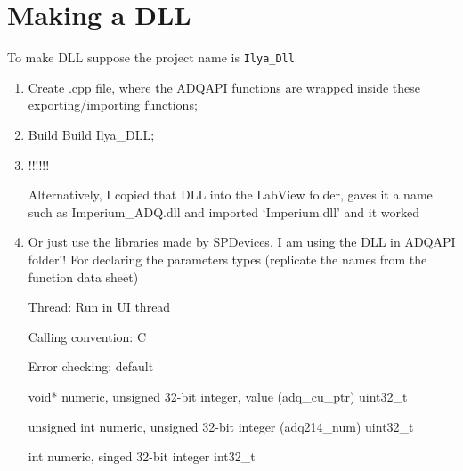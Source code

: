 \section{Making a DLL}
\begin{framed}\noindent
  To make DLL suppose the project name is \texttt{Ilya\_Dll}
\end{framed}
\begin{enumerate}
  \begin{framed}\noindent
       \hfill  {}

    \texttt{\#define        ANYNAME\_declspec(dllexport)}        \hfill

    \texttt{\#else}

    \texttt{\#define        ANYNAME\_declspec(dllimport)}        \hfill

    \texttt{extern "C" ANYNAME void name(parameters etc); }
  \end{framed}

\item Create .cpp  file, where the ADQAPI functions  are wrapped inside
  these exporting/importing functions;
\item Build \ira Build Ilya\_DLL;
\item {}  !!!!!!

\begin{framed}\noindent
     \hfill   {}

  Alternatively, I copied that DLL into  the LabView folder, gaves it a
  name  such as  Imperium\_ADQ.dll and  imported `Imperium.dll'  and it
  worked
\end{framed}
\item Or just use  the libraries made by SPDevices. I  am using the DLL
  in ADQAPI folder!!  For declaring the parameters types (replicate the
  names from the function data sheet)

\begin{framed}\noindent
  Thread: Run in UI thread

  Calling convention: C

  Error checking: default

  void*  \ira numeric,  unsigned 32-bit  integer, value  (adq\_cu\_ptr)
  uint32\_t

  unsigned  int \ira  numeric,  unsigned  32-bit integer  (adq214\_num)
  uint32\_t

  int \ira numeric, singed 32-bit integer int32\_t
\end{framed}
\end{enumerate}


\newpage
